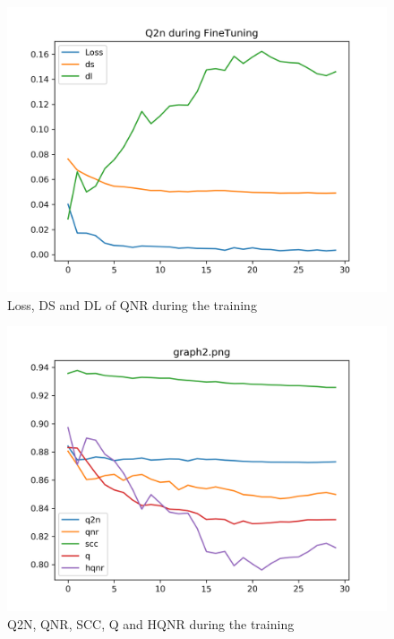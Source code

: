 \documentclass[12pt]{report}
\begin{document}
\begin{figure}[t]
    \centering
    \includegraphics[scale=.5]{qnr1.png}
    \caption{Loss, DS and DL of QNR during the training}
    \label{fig:qnr1}
\end{figure}


\begin{figure}
    \centering
    \includegraphics[scale=.5]{qnr2.png}
    \caption{Q2N, QNR, SCC, Q and HQNR during the training}
    \label{fig:qnr2}
\end{figure}
\end{document}
